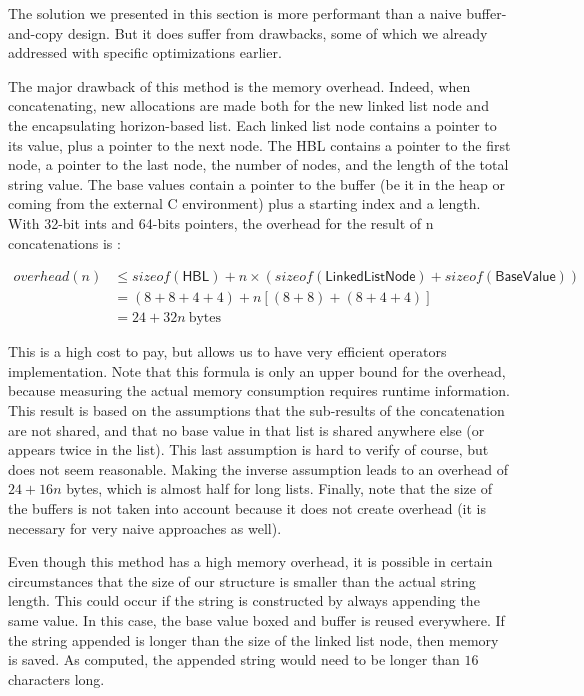 \documentclass[twoside,11pt,a4paper]{article}
\newcommand{\java}[1]{\textsf{#1}}
\begin{document}
The solution we presented in this section is more performant than a naive buffer-and-copy design. But it does suffer from drawbacks, some of which we already addressed with specific optimizations earlier.

The major drawback of this method is the memory overhead. Indeed, when concatenating, new allocations are made both for the new linked list node and the encapsulating horizon-based list. Each linked list node contains a pointer to its value, plus a pointer to the next node. The HBL contains a pointer to the first node, a pointer to the last node, the number of nodes, and the length of the total string value. The base values contain a pointer to the buffer (be it in the heap or coming from the external C environment) plus a starting index and a length. With 32-bit ints and 64-bits pointers, the overhead for the result of n concatenations is :

\begin{align*}
overhead(n) &\leq sizeof(\java{HBL}) + n \times (sizeof(\java{LinkedListNode}) + sizeof(\java{BaseValue})) \\
			&= (8+8+4+4) + n\left[(8 + 8)+(8+4+4)\right]\\
			&= 24 + 32n \ \text{bytes}
\end{align*}

This is a high cost to pay, but allows us to have very efficient operators implementation. Note that this formula is only an upper bound for the overhead, because measuring the actual memory consumption requires runtime information. This result is based on the assumptions that the sub-results of the concatenation are not shared, and that no base value in that list is shared anywhere else (or appears twice in the list). This last assumption is hard to verify of course, but does not seem reasonable. Making the inverse assumption leads to an overhead of $24 + 16n$ bytes, which is almost half for long lists. Finally, note that the size of the buffers is not taken into account because it does not create overhead (it is necessary for very naive approaches as well).

Even though this method has a high memory overhead, it is possible in certain circumstances that the size of our structure is smaller than the actual string length. This could occur if the string is constructed by always appending the same value. In this case, the base value boxed and buffer is reused everywhere. If the string appended is longer than the size of the linked list node, then memory is saved. As computed, the appended string would need to be longer than $16$ characters long.
\end{document}
